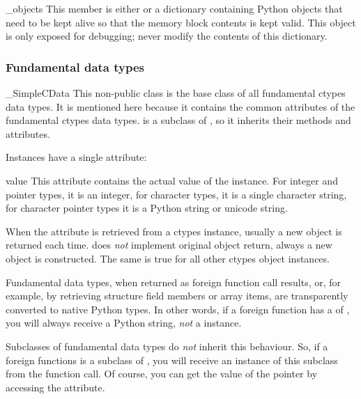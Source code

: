 \begin{memberdesc}{_objects}
This member is either  or a dictionary containing Python
objects that need to be kept alive so that the memory block
contents is kept valid.  This object is only exposed for
debugging; never modify the contents of this dictionary.
\end{memberdesc}


\subsubsection{Fundamental data types\label{ctypes-fundamental-data-types}}

\begin{classdesc*}{_SimpleCData}
This non-public class is the base class of all fundamental ctypes
data types. It is mentioned here because it contains the common
attributes of the fundamental ctypes data types.  
is a subclass of , so it inherits their methods and
attributes.
\end{classdesc*}

Instances have a single attribute:

\begin{memberdesc}{value}
This attribute contains the actual value of the instance. For
integer and pointer types, it is an integer, for character types,
it is a single character string, for character pointer types it
is a Python string or unicode string.

When the  attribute is retrieved from a ctypes instance,
usually a new object is returned each time.   does \emph{not}
implement original object return, always a new object is
constructed.  The same is true for all other ctypes object
instances.
\end{memberdesc}

Fundamental data types, when returned as foreign function call
results, or, for example, by retrieving structure field members or
array items, are transparently converted to native Python types.  In
other words, if a foreign function has a  of ,
you will always receive a Python string, \emph{not} a 
instance.

Subclasses of fundamental data types do \emph{not} inherit this behaviour.
So, if a foreign functions  is a subclass of ,
you will receive an instance of this subclass from the function call.
Of course, you can get the value of the pointer by accessing the
 attribute.

